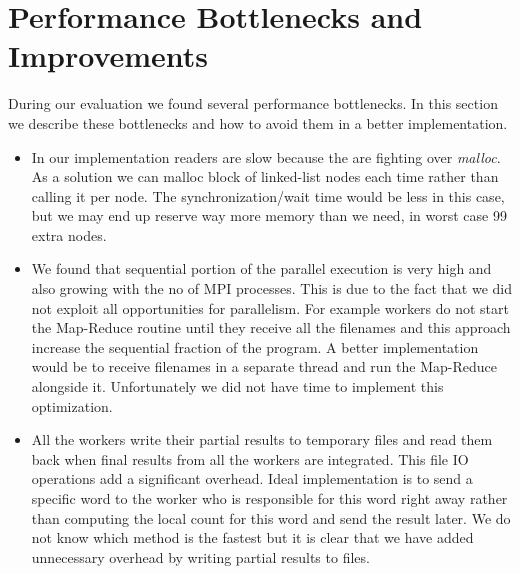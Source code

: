 \documentclass[12pt]{article}
\begin{document}
\section{Performance Bottlenecks and Improvements}
During our evaluation we found several performance bottlenecks. In this section we describe these bottlenecks and how to avoid them in a better implementation.
\begin{itemize}
    \item In our implementation readers are slow because the are fighting over {\em malloc}. As a solution we can malloc block of linked-list nodes each time rather than calling it per node. The synchronization/wait time would be less in this case, but we may end up reserve way more memory than we need, in worst case 99 extra nodes. 
    \item We found that sequential portion of the parallel execution is very high and also growing with the no of MPI processes. This is due to the fact that we 
        did not exploit all opportunities for parallelism. For example workers do not start the Map-Reduce routine until they receive all the filenames and this
        approach increase the sequential fraction of the program. A better implementation would be to receive filenames in a separate thread and run the Map-Reduce
        alongside it. Unfortunately we did not have time to implement this optimization.
    \item All the workers write their partial results to temporary files and read them back when final results from all the workers are integrated. This file IO
        operations add a significant overhead. Ideal implementation is to send a specific word to the worker who is responsible for this word right away 
        rather than
        computing the local count for this word and send the result later. We do not know which method is the fastest but it is clear that we have added 
        unnecessary overhead by writing partial results to files.
\end{itemize}


\end{document}
